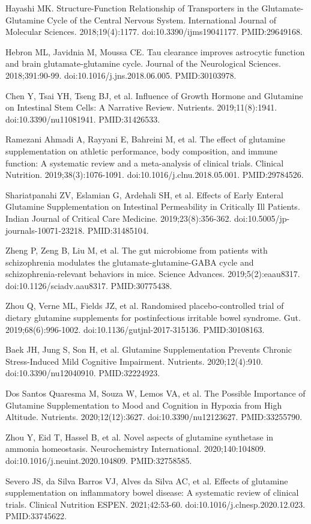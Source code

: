 \documentclass[11pt,oneside]{book}
\newcommand{\reff}[2]{\par\hangindent=7mm\hangafter=1\noindent[#1]\hspace{2mm}#2\par}
\begin{document}
\reff{12}{Hayashi MK. Structure-Function Relationship of Transporters in the Glutamate-Glutamine Cycle of the Central Nervous System. International Journal of Molecular Sciences. 2018;19(4):1177. doi:10.3390/ijms19041177. PMID:29649168.}
\reff{13}{Hebron ML, Javidnia M, Moussa CE. Tau clearance improves astrocytic function and brain glutamate-glutamine cycle. Journal of the Neurological Sciences. 2018;391:90-99. doi:10.1016/j.jns.2018.06.005. PMID:30103978.}
\reff{14}{Chen Y, Tsai YH, Tseng BJ, et al. Influence of Growth Hormone and Glutamine on Intestinal Stem Cells: A Narrative Review. Nutrients. 2019;11(8):1941. doi:10.3390/nu11081941. PMID:31426533.}
\reff{15}{Ramezani Ahmadi A, Rayyani E, Bahreini M, et al. The effect of glutamine supplementation on athletic performance, body composition, and immune function: A systematic review and a meta-analysis of clinical trials. Clinical Nutrition. 2019;38(3):1076-1091. doi:10.1016/j.clnu.2018.05.001. PMID:29784526.}
\reff{16}{Shariatpanahi ZV, Eslamian G, Ardehali SH, et al. Effects of Early Enteral Glutamine Supplementation on Intestinal Permeability in Critically Ill Patients. Indian Journal of Critical Care Medicine. 2019;23(8):356-362. doi:10.5005/jp-journals-10071-23218. PMID:31485104.}
\reff{17}{Zheng P, Zeng B, Liu M, et al. The gut microbiome from patients with schizophrenia modulates the glutamate-glutamine-GABA cycle and schizophrenia-relevant behaviors in mice. Science Advances. 2019;5(2):eaau8317. doi:10.1126/sciadv.aau8317. PMID:30775438.}
\reff{18}{Zhou Q, Verne ML, Fields JZ, et al. Randomised placebo-controlled trial of dietary glutamine supplements for postinfectious irritable bowel syndrome. Gut. 2019;68(6):996-1002. doi:10.1136/gutjnl-2017-315136. PMID:30108163.}
\reff{19}{Baek JH, Jung S, Son H, et al. Glutamine Supplementation Prevents Chronic Stress-Induced Mild Cognitive Impairment. Nutrients. 2020;12(4):910. doi:10.3390/nu12040910. PMID:32224923.}
\reff{20}{Dos Santos Quaresma M, Souza W, Lemos VA, et al. The Possible Importance of Glutamine Supplementation to Mood and Cognition in Hypoxia from High Altitude. Nutrients. 2020;12(12):3627. doi:10.3390/nu12123627. PMID:33255790.}
\reff{21}{Zhou Y, Eid T, Hassel B, et al. Novel aspects of glutamine synthetase in ammonia homeostasis. Neurochemistry International. 2020;140:104809. doi:10.1016/j.neuint.2020.104809. PMID:32758585.}
\reff{22}{Severo JS, da Silva Barros VJ, Alves da Silva AC, et al. Effects of glutamine supplementation on inflammatory bowel disease: A systematic review of clinical trials. Clinical Nutrition ESPEN. 2021;42:53-60. doi:10.1016/j.clnesp.2020.12.023. PMID:33745622.}
\end{document}

